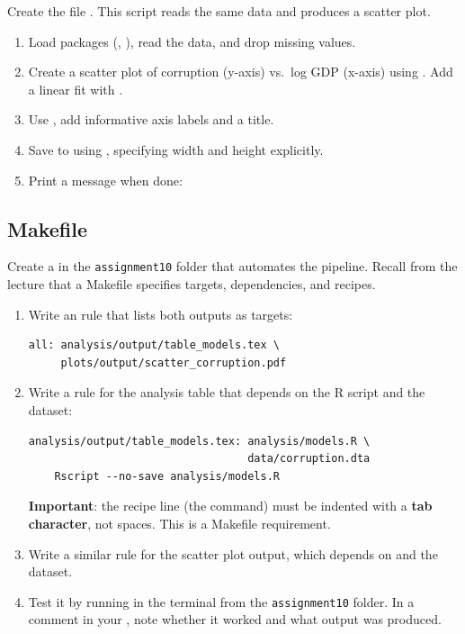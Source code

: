 Create the file . This script reads the same data and produces a scatter plot.

\begin{enumerate}[label=\alph*)]
  \item Load packages (, ), read the data, and drop missing values.
  \item Create a scatter plot of corruption (y-axis) vs.\ log GDP (x-axis) using . Add a linear fit with .
  \item Use , add informative axis labels and a title.
  \item Save to  using , specifying width and height explicitly.
  \item Print a message when done: 
\end{enumerate}

\subsection{Makefile}

Create a  in the \texttt{assignment10} folder that automates the pipeline. Recall from the lecture that a Makefile specifies targets, dependencies, and recipes.

\begin{enumerate}[label=\alph*)]
  \item Write an  rule that lists both outputs as targets:
  \begin{lstlisting}
all: analysis/output/table_models.tex \
     plots/output/scatter_corruption.pdf
  \end{lstlisting}
  \item Write a rule for the analysis table that depends on the R script and the dataset:
  \begin{lstlisting}
analysis/output/table_models.tex: analysis/models.R \
                                  data/corruption.dta
	Rscript --no-save analysis/models.R
  \end{lstlisting}
  \textbf{Important}: the recipe line (the  command) must be indented with a \textbf{tab character}, not spaces. This is a Makefile requirement.
  \item Write a similar rule for the scatter plot output, which depends on  and the dataset.
  \item Test it by running \code{make} in the terminal from the \texttt{assignment10} folder. In a comment in your \code{README.md}, note whether it worked and what output was produced.
\end{enumerate}

